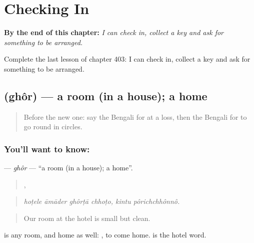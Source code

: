 
\chapter{Checking In}
\label{ch:bn-checking-in}

\begin{chapteropening}
\textbf{By the end of this chapter:} \emph{I can check in, collect a key and ask for something to be arranged.}

Complete the last lesson of chapter 403: I can check in, collect a key and ask for something to be arranged.
\end{chapteropening}

\section[\texorpdfstring{\bn{ঘর} (ghôr)}{ঘর (ghôr)}]{ (ghôr) — a room (in a house); a home}

\label{lesson:BN-C403-ghor}



\begin{quote}
Before the new one: say the Bengali for at a loss, then the Bengali for to go round in circles.
\end{quote}

\subsection*{You'll want to know: }
\textbf{} — \emph{ghôr} — \textquotedblleft{}a room (in a house); a home\textquotedblright{}.

\begin{quote}
   ,  
\end{quote}

\begin{quote}
\emph{hoṭele āmāder ghôrṭā chhoṭo, kintu pôrichchhônnô.}
\end{quote}

\begin{quote}
Our room at the hotel is small but clean.
\end{quote}

 is any room, and home as well:  , to come home.  is the hotel word.

